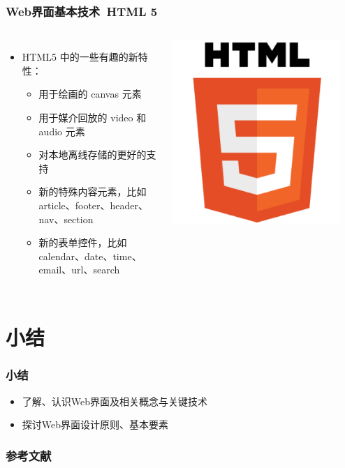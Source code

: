 \documentclass{beamer}
\begin{document}
\begin{frame}
	\frametitle{Web界面基本技术~{\small HTML 5}}
	\beamertemplatetransparentcovereddynamicmedium
	\begin{columns}
	\begin{itemize}[<+->]
		\item HTML5 中的一些有趣的新特性：
		\begin{itemize}
			\item 用于绘画的 canvas 元素
			\item 用于媒介回放的 video 和 audio 元素
			\item 对本地离线存储的更好的支持
			\item 新的特殊内容元素，比如 article、footer、header、nav、section
			\item 新的表单控件，比如 calendar、date、time、email、url、search
		\end{itemize}
	\end{itemize}
	\includegraphics[width=0.9\textwidth]{images/html-5.png}
	\end{columns}
\end{frame}

\section{小结}
\begin{frame}
	\frametitle{小结}
	\begin{itemize}
		\item 了解、认识Web界面及相关概念与关键技术
		\item 探讨Web界面设计原则、基本要素
	\end{itemize}
\end{frame}

\begin{frame}
	\frametitle{参考文献}
	
	
\end{frame}
\end{document}
